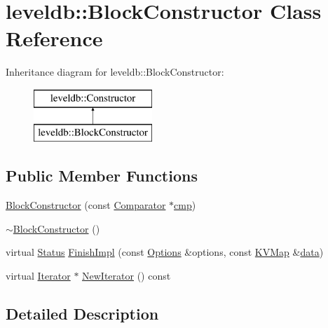 \hypertarget{classleveldb_1_1_block_constructor}{}\section{leveldb\+:\+:Block\+Constructor Class Reference}
\label{classleveldb_1_1_block_constructor}
Inheritance diagram for leveldb\+:\+:Block\+Constructor\+:\begin{figure}[H]
\begin{center}
\leavevmode
\includegraphics[height=2.000000cm]{classleveldb_1_1_block_constructor}
\end{center}
\end{figure}
\subsection*{Public Member Functions}
\begin{DoxyCompactItemize}
\item 
\hyperlink{classleveldb_1_1_block_constructor_a1f89523b9e688d6525da80d5595bee4c}{Block\+Constructor} (const \hyperlink{structleveldb_1_1_comparator}{Comparator} $\ast$\hyperlink{table__test_8cc_a87863e435922f0910ca8db43f02a6c0b}{cmp})
\item 
\hyperlink{classleveldb_1_1_block_constructor_a3eb2422f0a8eebe30c95c9e1f8b04ac9}{$\sim$\+Block\+Constructor} ()
\item 
virtual \hyperlink{classleveldb_1_1_status}{Status} \hyperlink{classleveldb_1_1_block_constructor_ae3f38f0769d34cb7d80776b8249f48ae}{Finish\+Impl} (const \hyperlink{structleveldb_1_1_options}{Options} \&options, const \hyperlink{namespaceleveldb_aac1e50450147be263e08252c6700f7a7}{K\+V\+Map} \&\hyperlink{classleveldb_1_1_constructor_a55a0363200d6e86d8beb3b15b75e3824}{data})
\item 
virtual \hyperlink{classleveldb_1_1_iterator}{Iterator} $\ast$ \hyperlink{classleveldb_1_1_block_constructor_a94b568e7f3aa7ad26eda141c3b4297ca}{New\+Iterator} () const 
\end{DoxyCompactItemize}


\subsection{Detailed Description}


